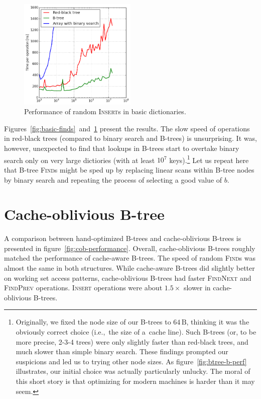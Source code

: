 \begin{figure}
\centering
\includegraphics[width=0.5\textwidth]{img/performance/basic-random-insert}
\caption{Performance of random \textsc{Insert}s in basic dictionaries.}
\label{fig:basic-perf}
\end{figure}

Figures~\ref{fig:basic-finds}~and~\ref{fig:basic-perf} present the results.
The slow speed of operations in red-black trees (compared to binary search
and B-trees) is unsurprising.
It was, however, unexpected to find that lookups in B-trees start to overtake
binary search only on very large dictiories (with at least $10^7$ keys).\footnote{%
	Originally, we fixed the node size of our B-trees to $64\,\text{B}$,
	thinking it was the obviously correct choice (i.e.,\ the size of
	a~cache line). Such B-trees (or, to be more precise, 2-3-4 trees)
	were only slightly faster than red-black trees, and much slower
	than simple binary search.
	These findings prompted our suspicions and led us to trying other
	node sizes.
	As figure~\ref{fig:btree-b-perf} illustrates, our initial choice
	was actually particularly unlucky.
	The moral of this short story is that optimizing for modern machines
	is harder than it may seem.
}
Let us repeat here that B-tree \textsc{Find}s might be sped up by
replacing linear scans within B-tree nodes by binary search and repeating
the process of selecting a good value of $b$.

\section{Cache-oblivious B-tree}
\label{sec:cob-perf}
A comparison between hand-optimized B-trees and cache-oblivious B-trees is
presented in figure~\ref{fig:cob-performance}. Overall, cache-oblivious
B-trees roughly matched the performance of cache-aware B-trees.
The speed of random \textsc{Find}s was almost the same in both structures.
While cache-aware B-trees did slightly better on working set access patterns,
cache-oblivious B-trees had faster \textsc{FindNext} and \textsc{FindPrev}
operations.
\textsc{Insert} operations were about $1.5\times$ slower in cache-oblivious
B-trees.

